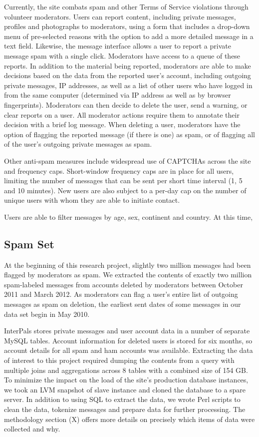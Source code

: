 \documentclass[preprint]{acm_proc_article-sp}
\begin{document}
Currently, the site combats spam and other Terms of Service violations through volunteer moderators. Users can report content, including private messages, profiles and photographs to moderators, using a form that includes a drop-down menu of pre-selected reasons with the option to add a more detailed message in a text field. Likewise, the message interface allows a user to report a private message spam with a single click. Moderators have access to a queue of these reports. In addition to the material being reported, moderators are able to make decisions based on the data from the reported user's account, including outgoing private messages, IP addresses, as well as a list of other users who have logged in from the same computer (determined via IP address as well as by browser fingerprints). Moderators can then decide to delete the user, send a warning, or clear reports on a user. All moderator actions require them to annotate their decision with a brief log message. When deleting a user, moderators have the option of flagging the reported message (if there is one) as spam, or of flagging all of the user's outgoing private messages as spam.

Other anti-spam measures include widespread use of CAPTCHAs across the site and frequency caps. Short-window frequency caps are in place for all users, limiting the number of messages that can be sent per short time interval (1, 5 and 10 minutes). New users are also subject to a per-day cap on the number of unique users with whom they are able to initiate contact. 

Users are able to filter messages by age, sex, continent and country. At this time, 

\subsection{Spam Set}

At the beginning of this research project, slightly two million messages had been flagged by moderators as spam. We extracted the contents of exactly two million spam-labeled messages from accounts deleted by moderators between October 2011 and March 2012. As moderators can flag a user's entire list of outgoing messages as spam on deletion, the earliest sent dates of some messages in our data set begin in May 2010. 

InterPals stores private messages and user account data in a number of separate MySQL tables. Account information for deleted users is stored for six months, so account details for all spam and ham accounts was available. Extracting the data of interest to this project required dumping the contents from a query with multiple joins and aggregations across 8 tables with a combined size of 154 GB. To minimize the impact on the load of the site's production database instances, we took an LVM snapshot of slave instance and cloned the database to a spare server. In addition to using SQL to extract the data, we wrote Perl scripts to clean the data, tokenize messages and prepare data for further processing. The methodology section (X) offers more details on precisely which items of data were collected and why.
\end{document}
